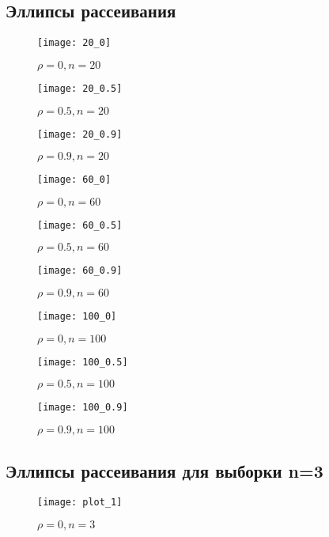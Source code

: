 \newpage
\subsection{Эллипсы рассеивания}
\begin{figure}[!htb]
    \centering
    \texttt{[image: 20\_0]}
    \caption{$\rho=0, n=20$}
\end{figure}
\newpage
\begin{figure}[!htb]
    \centering
    \texttt{[image: 20\_0.5]}
    \caption{$\rho=0.5, n=20$}
\end{figure}

\begin{figure}[!htb]
    \centering
    \texttt{[image: 20\_0.9]}
    \caption{$\rho=0.9, n=20$}
\end{figure}

\begin{figure}[!htb]
    \centering
    \texttt{[image: 60\_0]}
    \caption{$\rho=0, n=60$}
\end{figure}

\begin{figure}[!htb]
    \centering
    \texttt{[image: 60\_0.5]}
    \caption{$\rho=0.5, n=60$}
\end{figure}
\newpage
\begin{figure}[!htb]
    \centering
    \texttt{[image: 60\_0.9]}
    \caption{$\rho=0.9, n=60$}
\end{figure}

\begin{figure}[!htb]
    \centering
    \texttt{[image: 100\_0]}
    \caption{$\rho=0, n=100$}
\end{figure}

\begin{figure}[!htb]
    \centering
    \texttt{[image: 100\_0.5]}
    \caption{$\rho=0.5, n=100$}
\end{figure}

\begin{figure}[!htb]
    \centering
    \texttt{[image: 100\_0.9]}
    \caption{$\rho=0.9, n=100$}
\end{figure}
\newpage
\subsection{Эллипсы рассеивания для выборки n=3}
\begin{figure}[!htb]
    \centering
    \texttt{[image: plot\_1]}
    \caption{$\rho=0, n=3$}
\end{figure}

